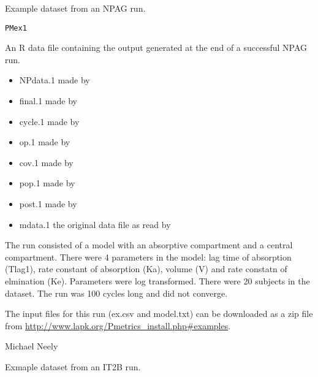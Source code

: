\documentclass[a4paper]{book}
\begin{document}
%
\begin{Description}\relax
Example dataset from an NPAG run.
\end{Description}
%
\begin{Usage}
\begin{verbatim}
PMex1
\end{verbatim}
\end{Usage}
%
\begin{Format}
An R data file containing the output generated at the end of a successful NPAG run.
\begin{itemize}

\item{} NPdata.1 made by 
\item{} final.1 made by  
\item{} cycle.1 made by 
\item{} op.1 made by 
\item{} cov.1 made by 
\item{} pop.1 made by 
\item{} post.1 made by 
\item{} mdata.1 the original data file as read by 

\end{itemize}
\end{Format}
%
\begin{Details}\relax
The run consisted of a model with an absorptive compartment and a central compartment.
There were 4 parameters in the model: lag time of absorption (Tlag1),
rate constant of absorption (Ka), volume (V) and rate constatn of elmination (Ke).
Parameters were log transformed.  There were 20 subjects in the dataset.  The run was
100 cycles long and did not converge.

The input files for this run (ex.csv and model.txt) can be downloaded as a zip file from 
\url{http://www.lapk.org/Pmetrics_install.php#examples}.
\end{Details}
%
\begin{Author}\relax
Michael Neely
\end{Author}
%
\begin{Description}\relax
Exmaple dataset from an IT2B run.
\end{Description}
\end{document}
